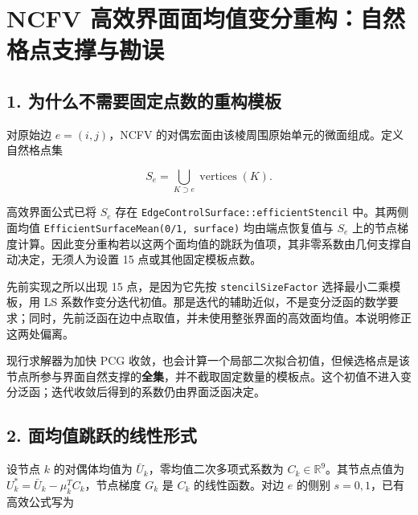 \documentclass[
]{ctexart}
\author{}
\date{}
\begin{document}
\hypertarget{ncfv-ux9ad8ux6548ux754cux9762ux9762ux5747ux503cux53d8ux5206ux91cdux6784ux81eaux7136ux683cux70b9ux652fux6491ux4e0eux52d8ux8bef}{%
\section{NCFV
高效界面面均值变分重构：自然格点支撑与勘误}\label{ncfv-ux9ad8ux6548ux754cux9762ux9762ux5747ux503cux53d8ux5206ux91cdux6784ux81eaux7136ux683cux70b9ux652fux6491ux4e0eux52d8ux8bef}}

\hypertarget{ux4e3aux4ec0ux4e48ux4e0dux9700ux8981ux56faux5b9aux70b9ux6570ux7684ux91cdux6784ux6a21ux677f}{%
\subsection{1.
为什么不需要固定点数的重构模板}\label{ux4e3aux4ec0ux4e48ux4e0dux9700ux8981ux56faux5b9aux70b9ux6570ux7684ux91cdux6784ux6a21ux677f}}

对原始边 \(e=(i,j)\)，NCFV
的对偶宏面由该棱周围原始单元的微面组成。定义自然格点集

\[S_e=\bigcup_{K\supset e}\operatorname{vertices}(K).\]

高效界面公式已将 \(S_e\) 存在
\texttt{EdgeControlSurface::efficientStencil} 中。其两侧面均值
\texttt{EfficientSurfaceMean(0/1,\ surface)} 均由端点恢复值与 \(S_e\)
上的节点梯度计算。因此变分重构若以这两个面均值的跳跃为值项，其非零系数由几何支撑自动决定，无须人为设置
15 点或其他固定模板点数。

先前实现之所以出现 15 点，是因为它先按 \texttt{stencilSizeFactor}
选择最小二乘模板，用 LS
系数作变分迭代初值。那是迭代的辅助近似，不是变分泛函的数学要求；同时，先前泛函在边中点取值，并未使用整张界面的高效面均值。本说明修正这两处偏离。

现行求解器为加快 PCG
收敛，也会计算一个局部二次拟合初值，但候选格点是该节点所参与界面自然支撑的\textbf{全集}，并不截取固定数量的模板点。这个初值不进入变分泛函；迭代收敛后得到的系数仍由界面泛函决定。

\hypertarget{ux9762ux5747ux503cux8df3ux8dc3ux7684ux7ebfux6027ux5f62ux5f0f}{%
\subsection{2.
面均值跳跃的线性形式}\label{ux9762ux5747ux503cux8df3ux8dc3ux7684ux7ebfux6027ux5f62ux5f0f}}

设节点 \(k\) 的对偶体均值为 \(\bar U_k\)，零均值二次多项式系数为
\(C_k\in\mathbb R^9\)。其节点点值为
\(U_k^*=\bar U_k-\mu_k^TC_k\)，节点梯度 \(G_k\) 是 \(C_k\)
的线性函数。对边 \(e\) 的侧别 \(s=0,1\)，已有高效公式写为
\end{document}
